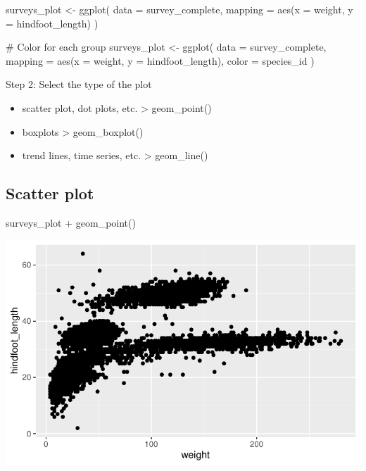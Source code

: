 \documentclass[
  letterpaper,
  DIV=11,
  numbers=noendperiod]{scrreprt}
\newenvironment{Shaded}{\begin{snugshade}}{\end{snugshade}}
\newcommand{\AttributeTok}[1]{\textcolor[rgb]{0.40,0.45,0.13}{#1}}
\newcommand{\CommentTok}[1]{\textcolor[rgb]{0.37,0.37,0.37}{#1}}
\newcommand{\FunctionTok}[1]{\textcolor[rgb]{0.28,0.35,0.67}{#1}}
\newcommand{\NormalTok}[1]{\textcolor[rgb]{0.00,0.23,0.31}{#1}}
\newcommand{\OtherTok}[1]{\textcolor[rgb]{0.00,0.23,0.31}{#1}}
\newcommand{\SpecialCharTok}[1]{\textcolor[rgb]{0.37,0.37,0.37}{#1}}
\providecommand{\tightlist}{%
  \setlength{\itemsep}{0pt}\setlength{\parskip}{0pt}}\usepackage{longtable,booktabs,array}
\begin{document}
\begin{Shaded}
\begin{Highlighting}[]
\NormalTok{surveys\_plot }\OtherTok{\textless{}{-}} \FunctionTok{ggplot}\NormalTok{(}
  \AttributeTok{data =}\NormalTok{ survey\_complete,}
  \AttributeTok{mapping =} \FunctionTok{aes}\NormalTok{(}\AttributeTok{x =}\NormalTok{ weight, }\AttributeTok{y =}\NormalTok{ hindfoot\_length)}
\NormalTok{)}

\CommentTok{\# Color for each group}
\NormalTok{surveys\_plot }\OtherTok{\textless{}{-}} \FunctionTok{ggplot}\NormalTok{(}
  \AttributeTok{data =}\NormalTok{ survey\_complete,}
  \AttributeTok{mapping =} \FunctionTok{aes}\NormalTok{(}\AttributeTok{x =}\NormalTok{ weight, }\AttributeTok{y =}\NormalTok{ hindfoot\_length),}
  \AttributeTok{color =}\NormalTok{ species\_id}
\NormalTok{)}
\end{Highlighting}
\end{Shaded}

Step 2: Select the type of the plot

\begin{itemize}
\tightlist
\item
  scatter plot, dot plots, etc. \textgreater{} geom\_point()
\item
  boxplots \textgreater{} geom\_boxplot()
\item
  trend lines, time series, etc. \textgreater{} geom\_line()
\end{itemize}

\subsection{Scatter plot}\label{scatter-plot}

\begin{Shaded}
\begin{Highlighting}[]
\NormalTok{surveys\_plot }\SpecialCharTok{+} \FunctionTok{geom\_point}\NormalTok{()}
\end{Highlighting}
\end{Shaded}

\includegraphics{src/notebooks/r_files/figure-pdf/unnamed-chunk-45-1.pdf}
\end{document}

